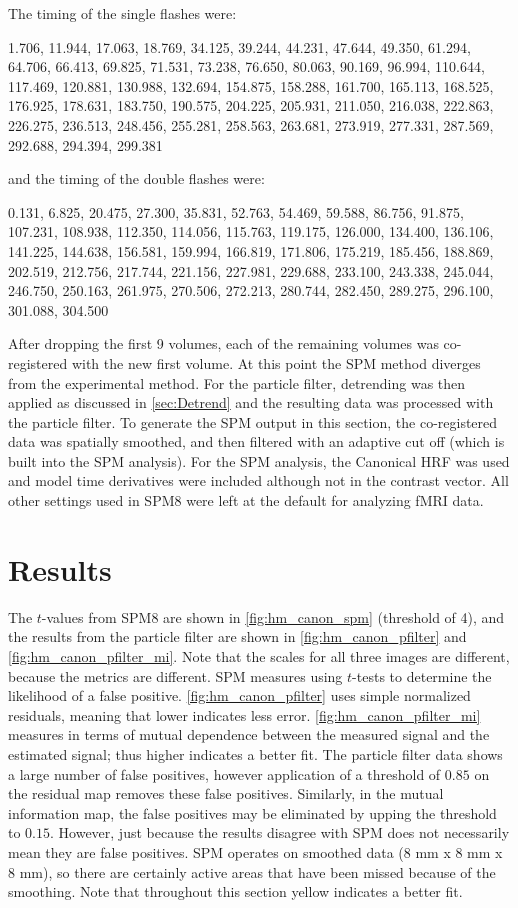 The timing of the single flashes were:

1.706, 11.944, 17.063, 18.769, 34.125, 39.244, 44.231, 47.644, 49.350,
61.294, 64.706, 66.413, 69.825, 71.531, 73.238, 76.650, 80.063,
90.169, 96.994, 110.644, 117.469, 120.881, 130.988, 132.694, 154.875,
158.288, 161.700, 165.113, 168.525, 176.925, 178.631, 183.750, 190.575,
204.225, 205.931, 211.050, 216.038, 222.863, 226.275, 236.513, 248.456,
255.281, 258.563, 263.681, 273.919, 277.331, 287.569, 292.688, 294.394,
299.381

and the timing of the double flashes were:

0.131, 6.825, 20.475, 27.300, 35.831, 52.763, 54.469, 59.588, 86.756,
91.875, 107.231, 108.938, 112.350, 114.056, 115.763, 119.175, 126.000,
134.400, 136.106, 141.225, 144.638, 156.581, 159.994, 166.819, 171.806,
175.219, 185.456, 188.869, 202.519, 212.756, 217.744, 221.156, 227.981,
229.688, 233.100, 243.338, 245.044, 246.750, 250.163, 261.975, 270.506,
272.213, 280.744, 282.450, 289.275, 296.100, 301.088, 304.500

After dropping the first 9 volumes, each of the remaining volumes was
co-registered with the new first volume. At this point the \ac{SPM} method
diverges from the experimental method. For the particle filter, detrending
was then applied as discussed in \autoref{sec:Detrend} and the resulting
data was processed with the particle filter. To generate the \ac{SPM} output
in this section, the co-registered data was spatially smoothed,
and then filtered with an adaptive cut off (which is built into the
\ac{SPM} analysis). For the \ac{SPM} analysis, the Canonical \ac{HRF} was used
and model time derivatives were included although not in the contrast
vector. All other settings used in SPM8 were left at the default
for analyzing \ac{fMRI} data.

\section{Results}
The $t$-values from SPM8 are shown in \autoref{fig:hm_canon_spm} (threshold of
4), and the results from
the particle filter are shown in \autoref{fig:hm_canon_pfilter} and \autoref{fig:hm_canon_pfilter_mi}.
Note that the scales for all three images are different, because the metrics are different.
\ac{SPM} measures using $t$-tests to determine the likelihood of a false positive. \autoref{fig:hm_canon_pfilter}
uses simple normalized residuals, meaning that lower indicates less error.
\autoref{fig:hm_canon_pfilter_mi} measures in terms of mutual dependence between the
measured signal and the estimated signal; thus higher indicates a better fit. The particle
filter data shows a large number of false positives, however application of a threshold
of $0.85$ on the residual map removes these false positives. Similarly, in the mutual information
map, the false positives may be eliminated by upping the threshold to $0.15$. However, just
because the results disagree with \ac{SPM} does not necessarily mean they are false positives.
\ac{SPM} operates on smoothed data (8 mm x 8 mm x 8 mm), so there are certainly active
areas that have been missed because of the smoothing. Note that throughout this
section yellow indicates a better fit.

